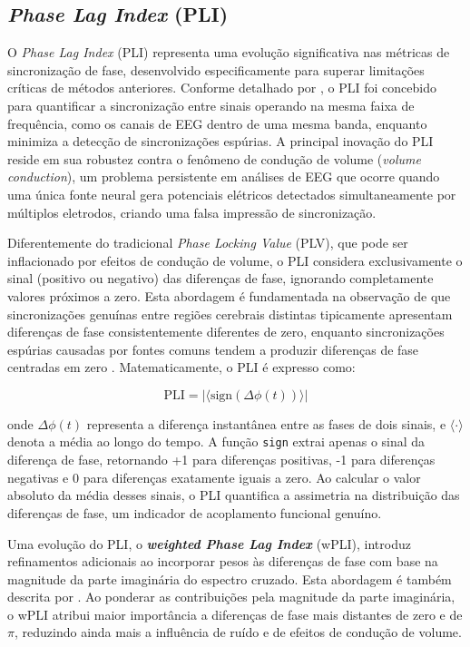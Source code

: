 \subsection{\textit{Phase Lag Index} (PLI)}
O \textit{Phase Lag Index} (PLI) representa uma evolução significativa nas métricas de sincronização de fase, desenvolvido especificamente para superar limitações críticas de métodos anteriores. Conforme detalhado por , o PLI foi concebido para quantificar a sincronização entre sinais operando na mesma faixa de frequência, como os canais de EEG dentro de uma mesma banda, enquanto minimiza a detecção de sincronizações espúrias. A principal inovação do PLI reside em sua robustez contra o fenômeno de condução de volume (\textit{volume conduction}), um problema persistente em análises de EEG que ocorre quando uma única fonte neural gera potenciais elétricos detectados simultaneamente por múltiplos eletrodos, criando uma falsa impressão de sincronização.

Diferentemente do tradicional \textit{Phase Locking Value} (PLV), que pode ser inflacionado por efeitos de condução de volume, o PLI considera exclusivamente o sinal (positivo ou negativo) das diferenças de fase, ignorando completamente valores próximos a zero. Esta abordagem é fundamentada na observação de que sincronizações genuínas entre regiões cerebrais distintas tipicamente apresentam diferenças de fase consistentemente diferentes de zero, enquanto sincronizações espúrias causadas por fontes comuns tendem a produzir diferenças de fase centradas em zero \cite{seraj2018cerebral}. Matematicamente, o PLI é expresso como:

\[
\text{PLI} = |\langle \text{sign}(\Delta\phi(t)) \rangle|
\]

onde \(\Delta\phi(t)\) representa a diferença instantânea entre as fases de dois sinais, e \(\langle \cdot \rangle\) denota a média ao longo do tempo. A função \texttt{sign} extrai apenas o sinal da diferença de fase, retornando +1 para diferenças positivas, -1 para diferenças negativas e 0 para diferenças exatamente iguais a zero. Ao calcular o valor absoluto da média desses sinais, o PLI quantifica a assimetria na distribuição das diferenças de fase, um indicador de acoplamento funcional genuíno.

Uma evolução do PLI, o \textit{\textbf{weighted Phase Lag Index}} (wPLI), introduz refinamentos adicionais ao incorporar pesos às diferenças de fase com base na magnitude da parte imaginária do espectro cruzado. Esta abordagem é também descrita por . Ao ponderar as contribuições pela magnitude da parte imaginária, o wPLI atribui maior importância a diferenças de fase mais distantes de zero e de \(\pi\), reduzindo ainda mais a influência de ruído e de efeitos de condução de volume.

